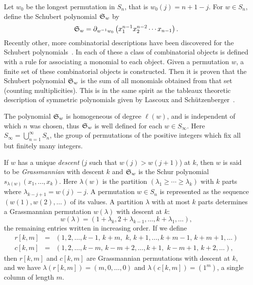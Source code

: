 Let $w_0$ be the longest permutation in $S_n$, that is
$w_0(j) = n{+}1{-}j$.
For $w \in S_n$, define the Schubert polynomial ${\frak S}_{w}$
by
$$
{\frak S}_{w} = \partial_{w^{-1}w_0}
\left( x_1^{n-1} x_2^{n-2}\cdots x_{n-1} \right).
$$
Recently other, more combinatorial descriptions have been discovered 
for the Schubert 
polynomials~\cite{Bergeron,BJS,Fomin_Kirillov}.
In each of these a class of combinatorial objects is 
defined with a rule for associating
a monomial to each object.
Given a permutation $w$, a finite set of these combinatorial
objects is constructed.
Then it is proven that the Schubert polynomial ${\frak S}_{w}$
is the sum of all monomials obtained from that set
(counting multiplicities).
This is in the same spirit as the tableaux 
theoretic description of 
symmetric polynomials given by Lascoux and 
Sch\"utzenberger~\cite{Lascoux_Schutzenberger_monoid_plactic}.

The polynomial ${\frak S}_{w}$ is homogeneous of degree
$\ell(w)$, and is independent of which $n$ was chosen, thus
${\frak S}_{w}$ is well defined for each $w\in S_{\infty}$.
Here $S_\infty = \bigcup_{n=1}^\infty S_n$, the group of permutations of the 
positive integers which fix all but finitely many integers.

If $w$ has a unique {\em descent} ($j$ such that $w(j) >
w(j{+}1)$) at $k$, then $w$ is said to be {\em Grassmannian} 
with descent $k$
and ${\frak S}_{w}$ is the Schur polynomial 
$s_{\lambda(w)}(x_1,\ldots,x_k)$.
Here $\lambda(w)$ is the partition 
$(\lambda_1\geq\cdots\geq\lambda_k)$ 
with $k$ parts where 
$\lambda_{k-j+1} = w(j){-}j$.
A permutation $w\in S_n$ is represented as the sequence 
$(w(1),w(2),\ldots)$ of its values.
A partition $\lambda$ with at most $k$ parts determines
a Grassmannian permutation $w(\lambda)$ with descent at $k$: 
$$
w(\lambda) = 
(1{+}\lambda_k,2{+}\lambda_{k-1},\ldots,k{+}\lambda_1,\ldots),
$$
the remaining entries written in increasing order.
If we define
\begin{eqnarray*}
r[k,m] &=&
(1,2,\ldots,k{-}1,\,k{+}m,\,\,k,\,k{+}1,\ldots,k{+}m{-}1,
\,k{+}m{+}1,\ldots)\\
c[k,m] &=&
(1,2,\ldots,k{-}m,\,k{-}m{+}2,\ldots,k{+}1,\,\,k{-}m{+}1,\,k{+}2,\ldots),
\end{eqnarray*}
then $r[k,m]$ and $c[k,m]$ are Grassmannian permutations
with descent at $k$,  and we have 
$\lambda(r[k,m]) = (m,0,\ldots,0)$ and
$\lambda(c[k,m]) = (1^m)$, a single column of length $m$.

